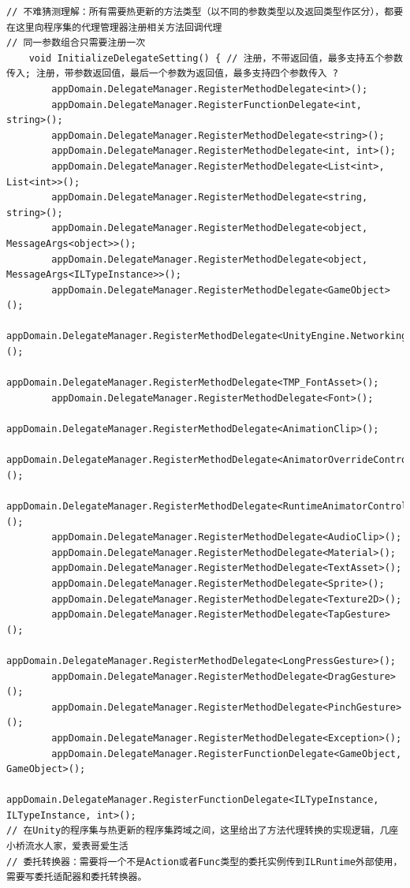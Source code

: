 \documentclass[9pt, b5paper]{article}
\begin{document}
\begin{verbatim}
// 不难猜测理解：所有需要热更新的方法类型（以不同的参数类型以及返回类型作区分），都要在这里向程序集的代理管理器注册相关方法回调代理    
// 同一参数组合只需要注册一次
    void InitializeDelegateSetting() { // 注册，不带返回值，最多支持五个参数传入; 注册，带参数返回值，最后一个参数为返回值，最多支持四个参数传入 ?
        appDomain.DelegateManager.RegisterMethodDelegate<int>();
        appDomain.DelegateManager.RegisterFunctionDelegate<int, string>();
        appDomain.DelegateManager.RegisterMethodDelegate<string>();
        appDomain.DelegateManager.RegisterMethodDelegate<int, int>();
        appDomain.DelegateManager.RegisterMethodDelegate<List<int>, List<int>>();
        appDomain.DelegateManager.RegisterMethodDelegate<string, string>();
        appDomain.DelegateManager.RegisterMethodDelegate<object, MessageArgs<object>>();
        appDomain.DelegateManager.RegisterMethodDelegate<object, MessageArgs<ILTypeInstance>>();
        appDomain.DelegateManager.RegisterMethodDelegate<GameObject>();
        appDomain.DelegateManager.RegisterMethodDelegate<UnityEngine.Networking.UnityWebRequest>();
        appDomain.DelegateManager.RegisterMethodDelegate<TMP_FontAsset>();
        appDomain.DelegateManager.RegisterMethodDelegate<Font>();
        appDomain.DelegateManager.RegisterMethodDelegate<AnimationClip>();
        appDomain.DelegateManager.RegisterMethodDelegate<AnimatorOverrideController>();
        appDomain.DelegateManager.RegisterMethodDelegate<RuntimeAnimatorController>();
        appDomain.DelegateManager.RegisterMethodDelegate<AudioClip>();
        appDomain.DelegateManager.RegisterMethodDelegate<Material>();
        appDomain.DelegateManager.RegisterMethodDelegate<TextAsset>();
        appDomain.DelegateManager.RegisterMethodDelegate<Sprite>();
        appDomain.DelegateManager.RegisterMethodDelegate<Texture2D>();
        appDomain.DelegateManager.RegisterMethodDelegate<TapGesture>();
        appDomain.DelegateManager.RegisterMethodDelegate<LongPressGesture>();
        appDomain.DelegateManager.RegisterMethodDelegate<DragGesture>();
        appDomain.DelegateManager.RegisterMethodDelegate<PinchGesture>();
        appDomain.DelegateManager.RegisterMethodDelegate<Exception>();
        appDomain.DelegateManager.RegisterFunctionDelegate<GameObject, GameObject>();
        appDomain.DelegateManager.RegisterFunctionDelegate<ILTypeInstance, ILTypeInstance, int>();
// 在Unity的程序集与热更新的程序集跨域之间，这里给出了方法代理转换的实现逻辑，几座小桥流水人家，爱表哥爱生活
// 委托转换器：需要将一个不是Action或者Func类型的委托实例传到ILRuntime外部使用，需要写委托适配器和委托转换器。

\end{verbatim}
\end{document}
